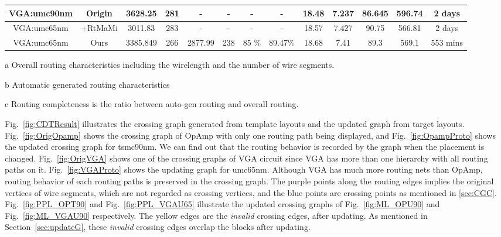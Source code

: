 \begin{table}
\begin{threeparttable}
\begin{center}
\begin{tabular}{|c|c|c|c|c|c|c|c|c|c|c|c|c|}
          VGA:umc90nm & Origin &  3628.25  &  281& -&-&- & - & 18.48 & 7.237&86.645 & 596.74 & 2 days \\
          \hline
          VGA:umc65nm & \cite{msc-bhattacharya-tcad06}+RtMaMi &  3011.83& 283 & -& - &- & - & 18.57 & 7.427 &90.75& 566.81&   2 days \\
          \hline
          VGA:umc65nm & Ours & 3385.849& 266 &  2877.99& 238 & 85 \% & 89.47\%&18.68 & 7.41& 89.3 & 569.1& 553 mins  \\
          \hline
        \end{tabular}
        \begin{tablenotes}
          \item [a] Overall routing characteristics including the wirelength and the number of wire segments. 
          \item [b] Automatic generated routing characteristics
          \item [c] Routing completeness is the ratio between auto-gen routing and overall routing. 
        \end{tablenotes}
        \end{center}
        \end{threeparttable}
      \end{table} 
         

      Fig.~\ref{fig:CDTResult} illustrates the crossing graph generated from template layouts and the updated graph from target layouts. Fig.~\ref{fig:OrigOpamp} shows the crossing graph of OpAmp with only one routing path being displayed, and Fig.~\ref{fig:OpampProto} shows the updated crossing graph for tsmc90nm. We can find out that the routing behavior is recorded by the graph when the placement is changed. Fig.~\ref{fig:OrigVGA} shows one of the crossing graphs of VGA circuit since VGA has more than one hierarchy with all routing paths on it. Fig.~\ref{fig:VGAProto} shows the updating graph for umc65nm. Although VGA has much more routing nets than OpAmp, routing behavior of each routing paths is preserved in the crossing graph. The purple points along the routing edges implies the original vertices of wire segments, which are not regarded as crossing vertices, and the blue points are crossing points as mentioned in \ref{sec:CGC}. Fig.~\ref{fig:PPL_OPT90} and Fig.~\ref{fig:PPL_VGAU65} illustrate the updated crossing graphs of Fig.~\ref{fig:ML_OPU90} and Fig.~\ref{fig:ML_VGAU90} respectively. The yellow edges are the {\it invalid} crossing edges, after updating. As mentioned in Section~\ref{sec:updateG}, these {\it invalid} crossing edges overlap the blocks after updating.

